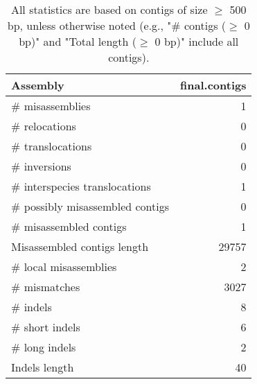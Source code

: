 \documentclass[12pt,a4paper]{article}
\begin{document}
\begin{table}[ht]
\begin{center}
\caption{All statistics are based on contigs of size $\geq$ 500 bp, unless otherwise noted (e.g., "\# contigs ($\geq$ 0 bp)" and "Total length ($\geq$ 0 bp)" include all contigs).}
\begin{tabular}{|l*{1}{|r}|}
\hline
Assembly & final.contigs \\ \hline
\# misassemblies & 1 \\ \hline
\hspace{5mm}\# relocations & 0 \\ \hline
\hspace{5mm}\# translocations & 0 \\ \hline
\hspace{5mm}\# inversions & 0 \\ \hline
\hspace{5mm}\# interspecies translocations & 1 \\ \hline
\# possibly misassembled contigs & 0 \\ \hline
\# misassembled contigs & 1 \\ \hline
Misassembled contigs length & 29757 \\ \hline
\# local misassemblies & 2 \\ \hline
\# mismatches & 3027 \\ \hline
\# indels & 8 \\ \hline
\hspace{5mm}\# short indels & 6 \\ \hline
\hspace{5mm}\# long indels & 2 \\ \hline
Indels length & 40 \\ \hline
\end{tabular}
\end{center}
\end{table}
\end{document}
